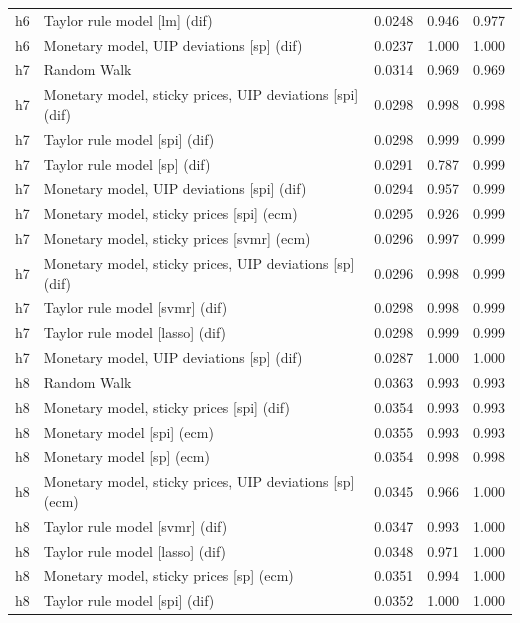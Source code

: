 \begin{ThreePartTable}
\begin{longtable}[t]{cp{5.5cm}ccc}
h6 & \raggedright Taylor rule model [lm] (dif) & 0.0248 & 0.946 & 0.977\\
h6 & \raggedright Monetary model, UIP deviations [sp] (dif) & 0.0237 & 1.000 & 1.000\\
\addlinespace
h7 & \raggedright Random Walk & 0.0314 & 0.969 & 0.969\\
h7 & \raggedright Monetary model, sticky prices, UIP deviations [spi] (dif) & 0.0298 & 0.998 & 0.998\\
h7 & \raggedright Taylor rule model [spi] (dif) & 0.0298 & 0.999 & 0.999\\
h7 & \raggedright Taylor rule model [sp] (dif) & 0.0291 & 0.787 & 0.999\\
h7 & \raggedright Monetary model, UIP deviations [spi] (dif) & 0.0294 & 0.957 & 0.999\\
h7 & \raggedright Monetary model, sticky prices [spi] (ecm) & 0.0295 & 0.926 & 0.999\\
h7 & \raggedright Monetary model, sticky prices [svmr] (ecm) & 0.0296 & 0.997 & 0.999\\
h7 & \raggedright Monetary model, sticky prices, UIP deviations [sp] (dif) & 0.0296 & 0.998 & 0.999\\
h7 & \raggedright Taylor rule model [svmr] (dif) & 0.0298 & 0.998 & 0.999\\
h7 & \raggedright Taylor rule model [lasso] (dif) & 0.0298 & 0.999 & 0.999\\
h7 & \raggedright Monetary model, UIP deviations [sp] (dif) & 0.0287 & 1.000 & 1.000\\
\addlinespace
h8 & \raggedright Random Walk & 0.0363 & 0.993 & 0.993\\
h8 & \raggedright Monetary model, sticky prices [spi] (dif) & 0.0354 & 0.993 & 0.993\\
h8 & \raggedright Monetary model [spi] (ecm) & 0.0355 & 0.993 & 0.993\\
h8 & \raggedright Monetary model [sp] (ecm) & 0.0354 & 0.998 & 0.998\\
h8 & \raggedright Monetary model, sticky prices, UIP deviations [sp] (ecm) & 0.0345 & 0.966 & 1.000\\
h8 & \raggedright Taylor rule model [svmr] (dif) & 0.0347 & 0.993 & 1.000\\
h8 & \raggedright Taylor rule model [lasso] (dif) & 0.0348 & 0.971 & 1.000\\
h8 & \raggedright Monetary model, sticky prices [sp] (ecm) & 0.0351 & 0.994 & 1.000\\
h8 & \raggedright Taylor rule model [spi] (dif) & 0.0352 & 1.000 & 1.000\\

\end{longtable}
\end{ThreePartTable}
